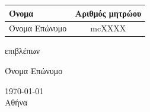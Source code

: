 \begin{titlepage}
{		\begin{table}[ht]
			\centering
			\begin{tabular}[H]{lc}
				\toprule
				Όνομα         & Αριθμός μητρώου \\ \midrule \midrule
				Όνομα Επώνυμο & mcΧΧΧΧ          \\
				\bottomrule
			\end{tabular}
		\end{table}

		\vfill
		επιβλέπων\par
		Όνομα Επώνυμο

		\vfill

		\begin{center}
			{\large \today\\ Αθήνα}
		\end{center}
	}
\end{titlepage}

